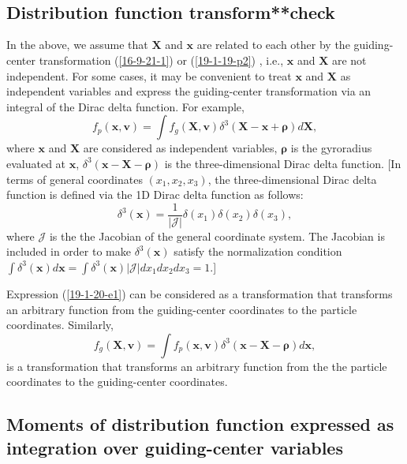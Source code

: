 \documentclass{article}
\newcommand{\tmmathbf}[1]{\ensuremath{\boldsymbol{#1}}}
\begin{document}
\

\

\subsection{Distribution function transform**check}

In the above, we assume that $\mathbf{X}$ and $\mathbf{x}$ are related to each
other by the guiding-center transformation (\ref{16-9-21-1}) or
(\ref{19-1-19-p2}) , i.e., $\mathbf{x}$ and $\mathbf{X}$ are not independent.
For some cases, it may be convenient to treat $\mathbf{x}$ and $\mathbf{X}$ as
independent variables and express the guiding-center transformation via an
integral of the Dirac delta function. For example,
\begin{equation}
  \label{19-1-20-e1} f_p (\mathbf{x}, \mathbf{v}) = \int f_g (\mathbf{X},
  \mathbf{v}) \delta^3 (\mathbf{X}-\mathbf{x}+\tmmathbf{\rho}) d\mathbf{X},
\end{equation}
where $\mathbf{x}$ and $\mathbf{X}$ are considered as independent variables,
$\tmmathbf{\rho}$ is the gyroradius evaluated at $\mathbf{x}$, $\delta^3
(\mathbf{x}-\mathbf{X}-\tmmathbf{\rho})$ is the three-dimensional Dirac delta
function. [In terms of general coordinates $(x_1, x_2, x_3)$, the
three-dimensional Dirac delta function is defined via the 1D Dirac delta
function as follows:
\begin{equation}
  \delta^3 (\mathbf{x}) = \frac{1}{| \mathcal{J} |} \delta (x_1) \delta (x_2)
  \delta (x_3),
\end{equation}
where $\mathcal{J}$ is the the Jacobian of the general coordinate system. The
Jacobian is included in order to make $\delta^3 (\mathbf{x})$ satisfy the
normalization condition $\int \delta^3 (\mathbf{x}) d\mathbf{x}= \int \delta^3
(\mathbf{x}) | \mathcal{J} | d x_1 d x_2 d x_3 = 1$.]

Expression (\ref{19-1-20-e1}) can be considered as a transformation that
transforms an arbitrary function from the guiding-center coordinates to the
particle coordinates. Similarly,
\begin{equation}
  f_g (\mathbf{X}, \mathbf{v}) = \int f_p (\mathbf{x}, \mathbf{v}) \delta^3
  (\mathbf{x}-\mathbf{X}-\tmmathbf{\rho}) d\mathbf{x},
\end{equation}
is a transformation that transforms an arbitrary function from the the
particle coordinates to the guiding-center coordinates.

\subsection{Moments of distribution function expressed as integration over
guiding-center variables}
\end{document}
